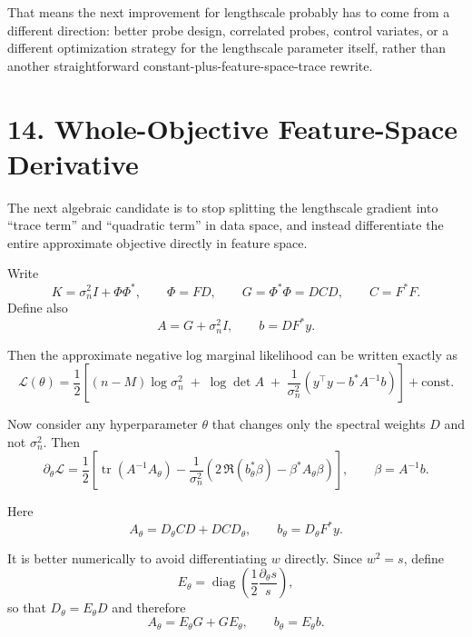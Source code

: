 \documentclass[11pt]{article}
\begin{document}
That means the next improvement for lengthscale probably has to come from a
different direction: better probe design, correlated probes, control variates,
or a different optimization strategy for the lengthscale parameter itself,
rather than another straightforward constant-plus-feature-space-trace rewrite.

\section*{14. Whole-Objective Feature-Space Derivative}

The next algebraic candidate is to stop splitting the lengthscale gradient into
``trace term'' and ``quadratic term'' in data space, and instead differentiate
the entire approximate objective directly in feature space.

Write
\begin{equation}
K = \sigma_n^2 I + \Phi \Phi^\ast,
\qquad
\Phi = F D,
\qquad
G = \Phi^\ast \Phi = D C D,
\qquad
C = F^\ast F.
\end{equation}
Define also
\begin{equation}
A = G + \sigma_n^2 I,
\qquad
b = D F^\ast y.
\end{equation}

Then the approximate negative log marginal likelihood can be written exactly as
\begin{equation}
\mathcal L(\theta)
=
\frac{1}{2}\left[
(n-M)\log \sigma_n^2
\;+\;
\log\det A
\;+\;
\frac{1}{\sigma_n^2}
\left(
y^\top y - b^\ast A^{-1} b
\right)
\right]
 + \mathrm{const}.
\end{equation}

Now consider any hyperparameter $\theta$ that changes only the spectral weights
$D$ and not $\sigma_n^2$. Then
\begin{equation}
\partial_\theta \mathcal L
=
\frac{1}{2}\left[
\operatorname{tr}(A^{-1} A_\theta)
-
\frac{1}{\sigma_n^2}
\left(
2\,\Re(b_\theta^\ast \beta)
-
\beta^\ast A_\theta \beta
\right)
\right],
\qquad
\beta = A^{-1} b.
\end{equation}

Here
\begin{equation}
A_\theta = D_\theta C D + D C D_\theta,
\qquad
b_\theta = D_\theta F^\ast y.
\end{equation}

It is better numerically to avoid differentiating $w$ directly. Since
$w^2 = s$, define
\begin{equation}
E_\theta
=
\operatorname{diag}\!\left(
\frac{1}{2}\frac{\partial_\theta s}{s}
\right),
\end{equation}
so that $D_\theta = E_\theta D$ and therefore
\begin{equation}
A_\theta = E_\theta G + G E_\theta,
\qquad
b_\theta = E_\theta b.
\end{equation}
\end{document}

